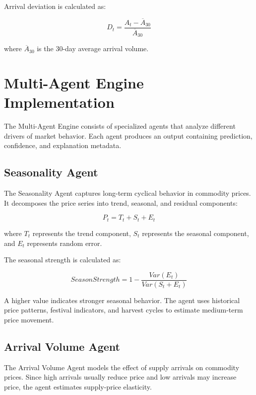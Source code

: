 \documentclass[12pt,a4paper]{report}
\begin{document}
Arrival deviation is calculated as:

\begin{equation}
D_t = \frac{A_t - \overline{A}_{30}}{\overline{A}_{30}}
\end{equation}

where $\overline{A}_{30}$ is the 30-day average arrival volume.

\section{Multi-Agent Engine Implementation}

The Multi-Agent Engine consists of specialized agents that analyze different drivers of market behavior. Each agent produces an output containing prediction, confidence, and explanation metadata.

\subsection{Seasonality Agent}

The Seasonality Agent captures long-term cyclical behavior in commodity prices. It decomposes the price series into trend, seasonal, and residual components:

\begin{equation}
P_t = T_t + S_t + E_t
\end{equation}

where $T_t$ represents the trend component, $S_t$ represents the seasonal component, and $E_t$ represents random error.

The seasonal strength is calculated as:

\begin{equation}
SeasonStrength = 1 - \frac{Var(E_t)}{Var(S_t + E_t)}
\end{equation}

A higher value indicates stronger seasonal behavior. The agent uses historical price patterns, festival indicators, and harvest cycles to estimate medium-term price movement.

\subsection{Arrival Volume Agent}

The Arrival Volume Agent models the effect of supply arrivals on commodity prices. Since high arrivals usually reduce price and low arrivals may increase price, the agent estimates supply-price elasticity.
\end{document}
